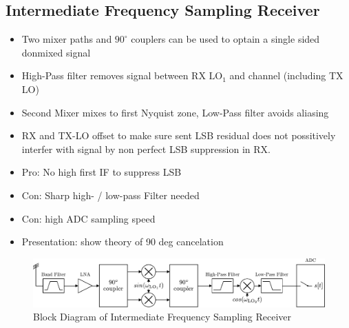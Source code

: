 \subsection{Intermediate Frequency Sampling Receiver}
\begin{itemize}
\item Two mixer paths and $90^\circ$ couplers can be used to optain a
  single sided donmixed signal
\item High-Pass filter removes signal between RX $\text{LO}_1$ and channel (including TX LO)
\item Second Mixer mixes to first Nyquist zone, Low-Pass filter avoids aliasing
\item RX and TX-LO offset to make sure sent LSB residual does not possitively
  interfer with signal by non perfect LSB suppression in RX.
\item Pro: No high first IF to suppress LSB
\item Con: Sharp high- / low-pass Filter needed
\item Con: high ADC sampling speed
\item Presentation: show theory of 90 deg cancelation
\end{itemize}

\begin{figure}[ht]
  \centering
  \includegraphics[width=\textwidth]{figures/if_rx_block_diagram}
  \caption{Block Diagram of Intermediate Frequency Sampling Receiver}
  \label{fig:rx_if_bd}
\end{figure}

